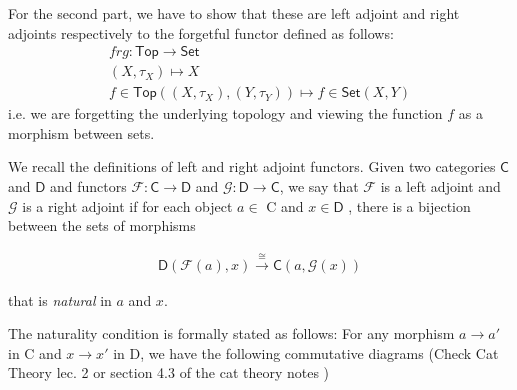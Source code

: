 \begin{frame}
    
For the second part, we have to show that these are left adjoint and right
adjoints respectively to the forgetful functor defined as follows: 
\begin{gather*}
    frg : \textsf{Top} \to \textsf{Set} \\
    (X, \tau_X ) \mapsto X \\
    f \in \textsf{Top}((X,\tau_X),(Y,\tau_Y )) \mapsto f \in \textsf{Set}(X,Y) 
\end{gather*}
i.e. we are forgetting the underlying topology and viewing the function \(f\) as a
morphism between sets. 
\end{frame}
\begin{frame}
    
We recall the definitions of left and right adjoint functors. Given two
categories \(\textsf{C}\) and \(\textsf{D}\) and functors \(\mathcal{F}:
\textsf{C} \to \textsf{D}\) and \(\mathcal{G}: \textsf{D} \to \textsf{C}\), we
say that \(\mathcal{F}\) is a left adjoint and \(\mathcal{G}\) is a right
adjoint if for each object \(a \in\) \textsf{C} and \(x \in\textsf{D}\) , there
is a bijection between the sets of morphisms 

\begin{gather*}
    \textsf{D}(\mathcal{F}(a) , x) \xrightarrow{\cong} \textsf{C}(a,
    \mathcal{G}(x))
\end{gather*}

that is \textit{natural} in \(a\) and \(x\). 
\end{frame}
\begin{frame}
The naturality condition is
formally stated as follows: For any morphism \(a \to a'\) in \textsf{C} and \(x
\to x'\) in \textsf{D}, we have the following commutative diagrams (Check Cat
Theory lec. 2 or section 4.3 of the cat theory notes ) %
    \begin{center}
    \end{center}
\end{frame}

